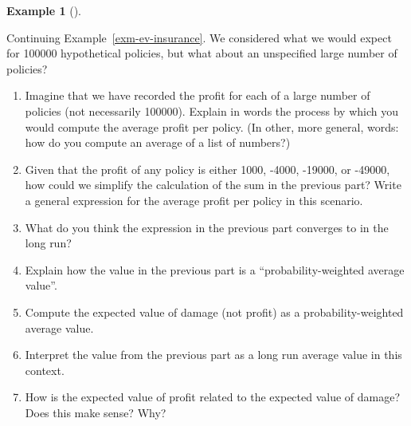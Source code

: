 \documentclass[
  letterpaper,
  DIV=11,
  numbers=noendperiod]{scrreprt}
\providecommand{\tightlist}{%
  \setlength{\itemsep}{0pt}\setlength{\parskip}{0pt}}
\theoremstyle{plain}
\theoremstyle{definition}
\newtheorem{example}{Example}[chapter]
\theoremstyle{definition}
\theoremstyle{definition}
\theoremstyle{remark}
\begin{document}
\begin{tcolorbox}[enhanced jigsaw, opacityback=0, left=2mm, colframe=quarto-callout-note-color-frame, toprule=.15mm, breakable, colback=white, leftrule=.75mm, arc=.35mm, rightrule=.15mm, bottomrule=.15mm]

\begin{example}[]\protect\hypertarget{exm-ev-insurance-2}{}\label{exm-ev-insurance-2}

Continuing Example~\ref{exm-ev-insurance}. We considered what we would
expect for 100000 hypothetical policies, but what about an unspecified
large number of policies?

\begin{enumerate}
\def\labelenumi{\arabic{enumi}.}
\tightlist
\item
  Imagine that we have recorded the profit for each of a large number of
  policies (not necessarily 100000). Explain in words the process by
  which you would compute the average profit per policy. (In other, more
  general, words: how do you compute an average of a list of numbers?)
\item
  Given that the profit of any policy is either 1000, -4000, -19000, or
  -49000, how could we simplify the calculation of the sum in the
  previous part? Write a general expression for the average profit per
  policy in this scenario.
\item
  What do you think the expression in the previous part converges to in
  the long run?
\item
  Explain how the value in the previous part is a ``probability-weighted
  average value''.
\item
  Compute the expected value of damage (not profit) as a
  probability-weighted average value.
\item
  Interpret the value from the previous part as a long run average value
  in this context.
\item
  How is the expected value of profit related to the expected value of
  damage? Does this make sense? Why?
\end{enumerate}

\end{example}

\end{tcolorbox}
\end{document}
